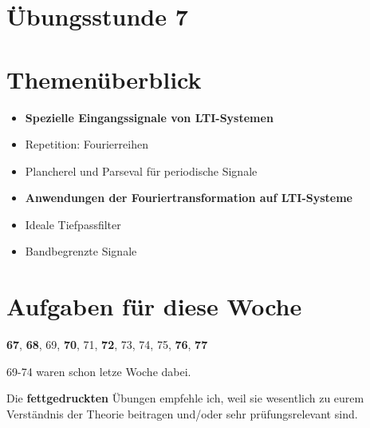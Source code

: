 \documentclass[11pt]{article}
\begin{document}
\thispagestyle{firstpage}

\setlength{\headheight}{1 \baselineskip}  %
\setlength{\parindent}{0pt}  %
\setlength{\parskip}{\baselineskip}  %

\vspace*{-5px}
\section*{Übungsstunde 7}

\section*{Themenüberblick}
\begin{itemize}
    \item \textbf{Spezielle Eingangssignale von LTI-Systemen}
    \item[] Repetition: Fourierreihen
    \item[] Plancherel und Parseval für periodische Signale
    \item \textbf{Anwendungen der Fouriertransformation auf LTI-Systeme}
    \item[] Ideale Tiefpassfilter
    \item[] Bandbegrenzte Signale
\end{itemize}

\section*{Aufgaben für diese Woche}
\vspace{-0.5cm}

\textbf{67}, \textbf{68}, 69, \textbf{70}, 71, \textbf{72}, 73, 74, 75, \textbf{76}, \textbf{77}\\
\vspace{-0.5cm}

69-74 waren schon letze Woche dabei.\\
\vspace{-0.5cm}

Die \textbf{fettgedruckten} Übungen empfehle ich, weil sie wesentlich zu eurem Verständnis der Theorie beitragen und/oder sehr prüfungsrelevant sind.

\vfill \null
\pagebreak
\end{document}
